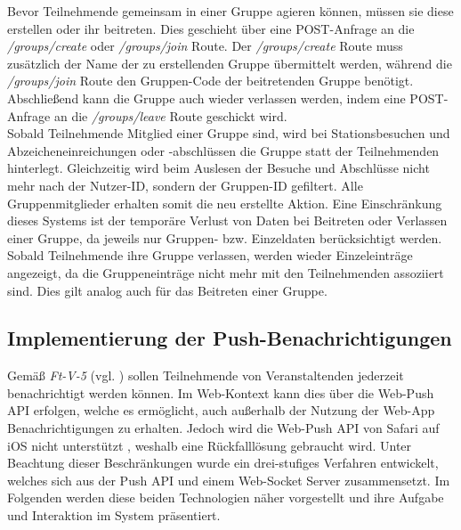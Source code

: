 Bevor Teilnehmende gemeinsam in einer Gruppe agieren können, müssen sie diese
erstellen oder ihr beitreten. Dies geschieht über eine POST-Anfrage an die
\textit{/groups/create} oder \textit{/groups/join} Route. Der
\textit{/groups/create} Route muss zusätzlich der Name der zu erstellenden
Gruppe übermittelt werden, während die \textit{/groups/join} Route den
Gruppen-Code der beitretenden Gruppe benötigt. Abschließend kann die Gruppe auch
wieder verlassen werden, indem eine POST-Anfrage an die \textit{/groups/leave}
Route geschickt wird.
\\
Sobald Teilnehmende Mitglied einer Gruppe sind, wird bei Stationsbesuchen und
Abzeicheneinreichungen oder -abschlüssen die Gruppe statt der Teilnehmenden
hinterlegt. Gleichzeitig wird beim Auslesen der Besuche und Abschlüsse nicht
mehr nach der Nutzer-ID, sondern der Gruppen-ID gefiltert. Alle
Gruppenmitglieder erhalten somit die neu erstellte Aktion. Eine Einschränkung
dieses Systems ist der temporäre Verlust von Daten bei Beitreten oder Verlassen
einer Gruppe, da jeweils nur Gruppen- bzw. Einzeldaten berücksichtigt werden.
Sobald Teilnehmende ihre Gruppe verlassen, werden wieder Einzeleinträge
angezeigt, da die Gruppeneinträge nicht mehr mit den Teilnehmenden
assoziiert sind. Dies gilt analog auch für das Beitreten einer Gruppe.

\subsection{Implementierung der Push-Benachrichtigungen} \label{ssec:impl-backend-push}

Gemäß \textit{Ft-V-5} (vgl. ) sollen Teilnehmende von
Veranstaltenden jederzeit benachrichtigt werden können. Im Web-Kontext kann dies
über die Web-Push API erfolgen, welche es ermöglicht, auch außerhalb der Nutzung
der Web-App Benachrichtigungen zu erhalten. Jedoch wird die Web-Push API
von Safari auf iOS nicht unterstützt \cite{MDN2021}, weshalb eine Rückfalllösung
gebraucht wird. Unter Beachtung dieser Beschränkungen wurde ein drei-stufiges
Verfahren entwickelt, welches sich aus der Push API und einem Web-Socket Server
zusammensetzt. Im Folgenden werden diese beiden Technologien näher vorgestellt
und ihre Aufgabe und Interaktion im System präsentiert.

